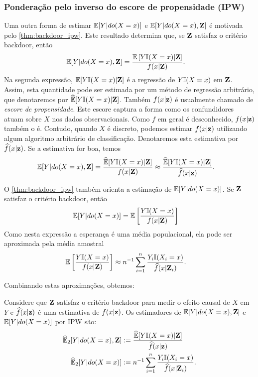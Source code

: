 \subsubsection{Ponderação pelo inverso do escore de propensidade (IPW)}

Uma outra forma de estimar 
${\mathbb E}[Y|do(X=x)]$ e ${\mathbb E}[Y|do(X=x),{\mathbf{Z}}]$ é
motivada pelo \cref{thm:backdoor_ipw}.
Este resultado determina que, 
se ${\mathbf{Z}}$ satisfaz o critério backdoor, então
\begin{align*}
 {\mathbb E}[Y|do(X=x),{\mathbf{Z}}] 
 &= \frac{{\mathbb E}\left[Y {\mathbb I}(X=x)|{\mathbf{Z}}\right]}{f(x|{\mathbf{Z}})}.
\end{align*}
Na segunda expressão, ${\mathbb E}[Y {\mathbb I}(X=x)|{\mathbf{Z}}]$ é 
a regressão de $Y{\mathbb I}(X=x)$ em ${\mathbf{Z}}$.
Assim, esta quantidade pode ser estimada por
um método de regressão arbitrário, que
denotaremos por $\widehat{{\mathbb E}}[Y {\mathbb I}(X=x)|{\mathbf{Z}}]$.
Também $f(x|{\mathbf{z}})$ é 
usualmente chamado de \textit{escore de propensidade}.
Este escore captura a forma como 
os confundidores atuam sobre $X$
nos dados observacionais.
Como $f$ em geral é desconhecido,
$f(x|{\mathbf{z}})$ também o é.
Contudo, quando $X$ é discreto,
podemos estimar $f(x|{\mathbf{z}})$ utilizando
algum algoritmo arbitrário de classificação.
Denotaremos esta estimativa por $\widehat{f}(x|{\mathbf{z}})$.
Se a estimativa for boa, temos
\begin{align*}
 {\mathbb E}[Y|do(X=x),{\mathbf{Z}}]
 &= \frac{\widehat{{\mathbb E}}[Y {\mathbb I}(X=x)|{\mathbf{Z}}]}{f(x|{\mathbf{Z}})}
 \approx \frac{\widehat{{\mathbb E}}[Y {\mathbb I}(X=x)|{\mathbf{Z}}]}{\widehat{f}(x|{\mathbf{z}})}.
\end{align*}

O \cref{thm:backdoor_ipw} também orienta
a estimação de ${\mathbb E}[Y|do(X=x)]$.
Se ${\mathbf{Z}}$ satisfaz o critério backdoor, então
\begin{align*}
 {\mathbb E}[Y|do(X=x)]
 &= {\mathbb E}\left[\frac{Y {\mathbb I}(X=x)}{f(x|{\mathbf{Z}})}\right]
\end{align*}
Como nesta expressão a esperança é
uma média populacional,
ela pode ser aproximada pela média amostral
\begin{align*}
 {\mathbb E}\left[\frac{Y {\mathbb I}(X=x)}{f(x|{\mathbf{Z}})}\right]
 &\approx n^{-1} \sum_{i=1}^n \frac{Y_i {\mathbb I}(X_i=x)}{\widehat{f}(x|{\mathbf{Z}}_i)}.
\end{align*}

Combinando estas aproximações, obtemos:
\begin{definition}
 \label{def:ipw}
 Considere que ${\mathbf{Z}}$ satisfaz o critério backdoor para
 medir o efeito causal de $X$ em $Y$ e
 $\widehat{f}(x|{\mathbf{z}})$ é uma estimativa de $f(x|{\mathbf{z}})$.
 Os estimadores de ${\mathbb E}[Y|do(X=x),{\mathbf{Z}}]$ e ${\mathbb E}[Y|do(X=x)]$ 
 por IPW são:
\begin{align*}
 {\widehat{{\mathbb E}}}_{2}[Y|do(X=x),{\mathbf{Z}}] &:= \frac{\widehat{{\mathbb E}}[Y {\mathbb I}(X=x)|{\mathbf{Z}}]}{\widehat{f}(x|{\mathbf{z}})} \\
 {\widehat{{\mathbb E}}}_{2}[Y|do(X=x)] &:= n^{-1} \sum_{i=1}^n \frac{Y_i {\mathbb I}(X_i=x)}{\widehat{f}(x|{\mathbf{Z}}_i)}.
\end{align*}
\end{definition}

